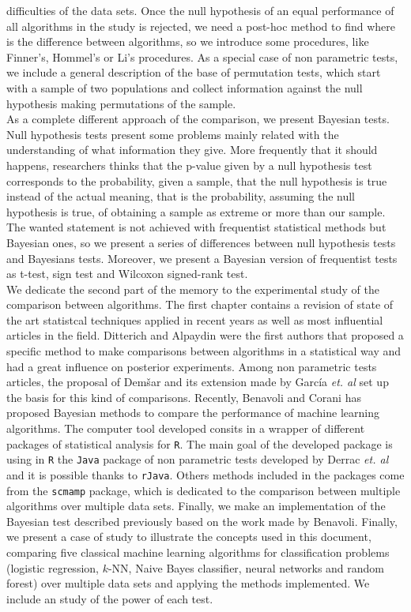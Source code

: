 difficulties of the data sets. Once the null hypothesis of an 
equal performance of all algorithms in the study is rejected, 
we need a post-hoc method to find where is the difference 
between algorithms, so we introduce some procedures, like 
Finner’s, Hommel’s or Li’s procedures. As a special case of 
non parametric tests, we include a general description of the 
base of permutation tests, which start with a sample of two 
populations and collect information against the null 
hypothesis making permutations of the sample.\\ 
	As a complete different approach of the comparison, we 
present Bayesian tests. Null hypothesis tests present some 
problems mainly related with the understanding of what 
information they give. More frequently that it should 
happens, researchers thinks that the p-value given by a null 
hypothesis test corresponds to the probability, given a 
sample, that the null hypothesis is true instead of the 
actual meaning, that is the probability, assuming the null 
hypothesis is true, of obtaining a sample as extreme or more 
than our sample. The wanted statement is not achieved with 
frequentist statistical methods but Bayesian ones, so we 
present a series of differences between null hypothesis tests 
and Bayesians tests. Moreover, we present a Bayesian version 
of frequentist tests as t-test, sign test and Wilcoxon 
signed-rank test.\\
	We dedicate the second part of the memory to the 
experimental study of the comparison between algorithms. The 
first chapter contains a revision of state of the art 
statistcal techniques applied in recent years as well as most 
influential articles in the field.  Ditterich and  Alpaydin 
were the first authors that proposed a specific method to 
make comparisons between algorithms in a statistical way and 
had a great influence on posterior experiments. Among non 
parametric tests articles, the proposal of Dem\v{s}ar and its 
extension made by García \textit{et. al} set up the basis for 
this kind of comparisons. Recently, Benavoli and Corani has 
proposed Bayesian methods to compare the performance of 
machine learning algorithms. 
	The computer tool developed consits in a wrapper of 
different packages of statistical analysis for \texttt{R}. 
The main goal of the developed package is using in \texttt{R} 
the \texttt{Java} package of non parametric tests developed 
by Derrac \textit{et. al} and it is possible thanks to 
\texttt{rJava}. Others methods included in the packages come 
from the \texttt{scmamp} package, which is dedicated to the 
comparison between multiple algorithms over multiple data 
sets. Finally, we make an implementation of the Bayesian test 
described previously based on the work made by Benavoli. 
	Finally, we present a case of study to illustrate the 
concepts used in this document, comparing five classical 
machine learning algorithms for classification problems 
(logistic regression, $k$-NN, Naive Bayes classifier, neural 
networks and random forest) over multiple data sets and 
applying the methods implemented. We include an study of the 
power of each test. 

